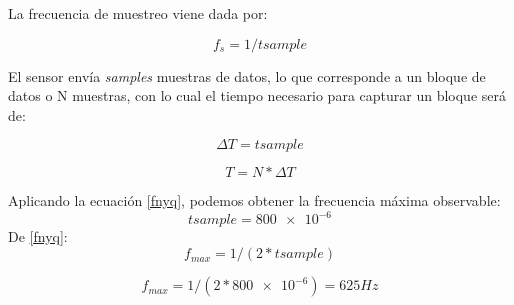 La frecuencia de muestreo viene dada por:

\begin{equation}
f_{s}=1/tsample
\end{equation}

El sensor envía \textit{samples} muestras de datos, lo que corresponde a un bloque de datos o N muestras, con lo cual el tiempo necesario para capturar un bloque será de:

\begin{equation}
\Delta T=tsample
\end{equation}

\begin{equation}
T=N*\Delta T
\end{equation}

Aplicando la ecuación \eqref{fnyq}, podemos obtener la frecuencia máxima observable:
\begin{equation}
tsample=\num{800e-6}
\end{equation}
De \eqref{fnyq}:
\begin{equation}
f_{max}= 1/(2*tsample)
\end{equation}

\begin{equation}
f_{max}=1/(2*\num{800e-6})=625 Hz
\end{equation}


